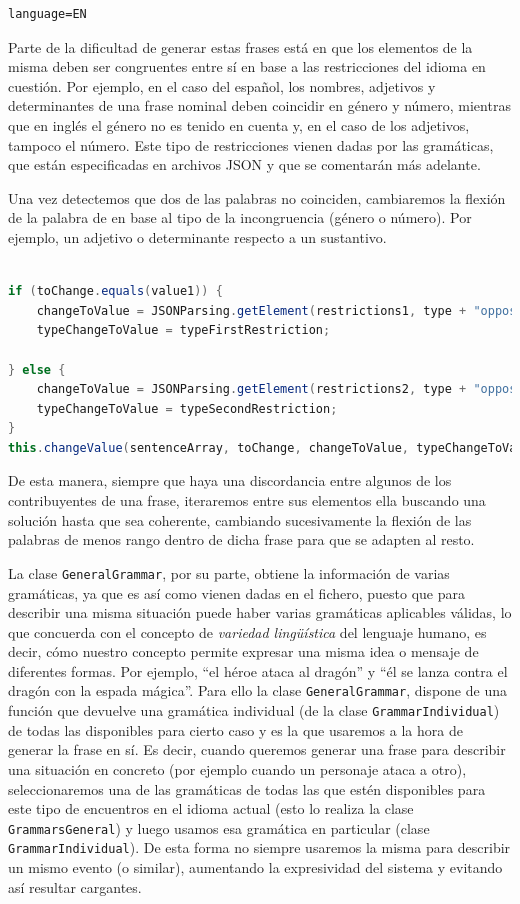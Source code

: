 \begin{verbatim}
language=EN
\end{verbatim}

\noindent Parte de la dificultad de generar estas frases está en que los elementos de la misma deben ser congruentes entre sí en base a las restricciones del idioma en cuestión. Por ejemplo, en el caso del español, los nombres, adjetivos y determinantes de una frase nominal deben coincidir en género y número, mientras que en inglés el género no es tenido en cuenta y, en el caso de los adjetivos, tampoco el número. Este tipo de restricciones vienen dadas por las gramáticas, que están especificadas en archivos JSON y que se comentarán más adelante.

Una vez detectemos que dos de las palabras no coinciden, cambiaremos la flexión de la palabra de en base al tipo de la incongruencia (género o número). Por ejemplo, un adjetivo o determinante respecto a un sustantivo.

\begin{lstlisting}[language=java]

if (toChange.equals(value1)) {
    changeToValue = JSONParsing.getElement(restrictions1, type + "opposite");
    typeChangeToValue = typeFirstRestriction; 
     
} else {
    changeToValue = JSONParsing.getElement(restrictions2, type + "opposite");
    typeChangeToValue = typeSecondRestriction;
}
this.changeValue(sentenceArray, toChange, changeToValue, typeChangeToValue);

\end{lstlisting}

\noindent De esta manera, siempre que haya una discordancia entre algunos de los contribuyentes de una frase, iteraremos entre sus elementos ella buscando una solución hasta que sea coherente, cambiando sucesivamente la flexión de las palabras de menos rango dentro de dicha frase para que se adapten al resto.

La clase \texttt{GeneralGrammar}, por su parte, obtiene la información de varias gramáticas, ya que es así como vienen dadas en el fichero, puesto que para describir una misma situación puede haber varias gramáticas aplicables válidas, lo que concuerda con el concepto de \emph{variedad lingüística} del lenguaje humano, es decir, cómo nuestro concepto permite expresar una misma idea o mensaje de diferentes formas. Por ejemplo, ``el héroe ataca al dragón'' y ``él se lanza contra el dragón con la espada mágica''. 
Para ello la clase \texttt{GeneralGrammar}, dispone de una función que devuelve una gramática individual (de la clase \texttt{GrammarIndividual}) de todas las disponibles para cierto caso y es la que usaremos a la hora de generar la frase en sí. Es decir, cuando queremos generar una frase para describir una situación en concreto (por ejemplo cuando un personaje ataca a otro), seleccionaremos una de las gramáticas de todas las que estén disponibles para este tipo de encuentros en el idioma actual (esto lo realiza la clase \texttt{GrammarsGeneral}) y luego usamos esa gramática en particular (clase \texttt{GrammarIndividual}). De esta forma no siempre usaremos la misma para describir un mismo evento (o similar), aumentando la expresividad del sistema y evitando así resultar cargantes.

